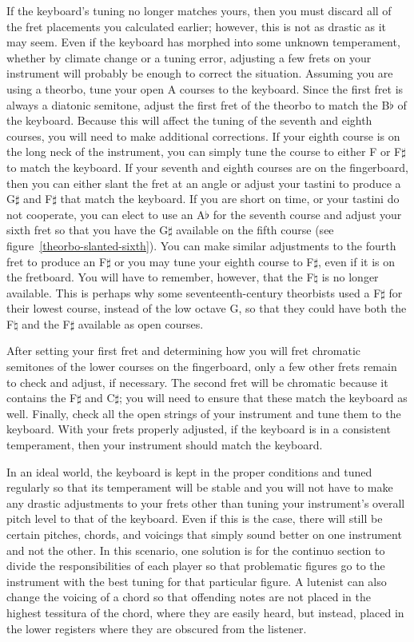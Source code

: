 If the keyboard's tuning no longer matches yours, then you must discard
all of the fret placements you calculated earlier; however, this is not as drastic as it may seem.
Even if the keyboard has morphed into some unknown temperament, whether by climate change or a
tuning error, adjusting a few frets on your instrument will probably be enough to correct the
situation.  Assuming you are using a theorbo, tune your open A courses to the keyboard.  Since the
first fret is always a diatonic semitone, adjust the first fret of the theorbo to match the B$\flat$
of the keyboard.  Because this will affect the tuning of the seventh and eighth courses, you will
need to make additional corrections.  If your eighth course is on the long neck of the instrument,
you can simply tune the course to either F or F$\sharp$ to match the keyboard.  If your seventh and
eighth courses are on the fingerboard, then you can either slant the fret at an angle or adjust your
tastini to produce a G$\sharp$ and F$\sharp$ that match the keyboard.  If you are short
on time, or your tastini do not cooperate, you can elect to use an A$\flat$ for the seventh course
and adjust your sixth fret so that you have the G$\sharp$ available on the fifth course (see
figure~\ref{theorbo-slanted-sixth}).  You can make similar adjustments to the fourth fret to produce
an F$\sharp$ or you may tune your eighth course to F$\sharp$, even if it is on the fretboard.  You
will have to remember, however, that the F$\natural$ is no longer available.  This is perhaps why
some seventeenth-century theorbists used a F$\sharp$ for their lowest course, instead of the low
octave G, so that they could have both the F$\natural$ and the F$\sharp$ available as open courses.

After setting your first fret and determining how you will fret chromatic semitones of the lower
courses on the fingerboard, only a few other frets remain to check and adjust, if necessary.  The
second fret will be chromatic because it contains the F$\sharp$ and C$\sharp$; you will need to
ensure that these match the keyboard as well. Finally, check all the open strings of your instrument
and tune them to the keyboard. With your frets properly adjusted, if the keyboard is in a consistent
temperament, then your instrument should match the keyboard.

In an ideal world, the keyboard is kept in the proper conditions and tuned regularly so that its
temperament will be stable and you will not have to make any drastic adjustments to your frets other
than tuning your instrument's overall pitch level to that of the keyboard. Even if this is the case,
there will still be certain pitches, chords, and voicings that simply sound better on one instrument
and not the other.  In this scenario, one solution is for the continuo section to divide the
responsibilities of each player so that problematic figures go to the instrument with the best
tuning for that particular figure.  A lutenist can also change the voicing of a chord so that
offending notes are not placed in the highest tessitura of the chord, where they are easily heard,
but instead, placed in the lower registers where they are obscured from the listener.

